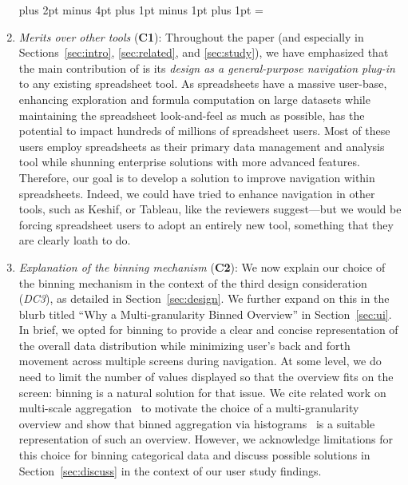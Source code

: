 \begin{enumerate}
\leftmargin=25pt \rightmargin=0pt   \itemindent=0pt \listparindent=0pt \topsep=0pt plus 2pt minus 4pt \partopsep=0pt plus 1pt minus 1pt \parsep=0pt plus 1pt \itemsep=\parsep

\item \textit{Merits over other tools} (\textbf{C1}): 
Throughout the paper (and especially in 
Sections~\ref{sec:intro}, \ref{sec:related},
and \ref{sec:study}), we have emphasized
that the main contribution of \noah
is its \emph{design as a general-purpose navigation plug-in} 
to any existing spreadsheet tool. 
As spreadsheets have a massive user-base, 
enhancing exploration and formula computation 
on large datasets while maintaining 
the spreadsheet look-and-feel as much as possible, 
has the potential to impact hundreds of millions 
of spreadsheet users. 
Most of these users employ spreadsheets 
as their primary data management and analysis 
tool while shunning enterprise solutions 
with more advanced features. 
Therefore, our goal is to develop a 
solution to improve navigation within spreadsheets.
Indeed, we could have tried to enhance navigation
in other tools, such as Keshif, or Tableau, like
the reviewers suggest---but we would be forcing
spreadsheet users to adopt an entirely new tool, something
that they are clearly loath to do. 

\item \textit{Explanation of the binning mechanism} (\textbf{C2}): 
We now explain our choice
of the binning mechanism in 
the context of the third design consideration (\emph{DC3}),
as detailed in Section~\ref{sec:design}.
We further expand on this in the blurb titled 
``Why a Multi-granularity Binned Overview'' 
in Section~\ref{sec:ui}.
In brief, we opted for binning to 
provide a clear and concise 
representation of the overall data 
distribution while minimizing user's back 
and forth movement across multiple screens 
during navigation. 
At some level, we do need to limit the number
of values displayed so that the overview
fits on the screen: binning is a natural solution
for that issue. 
We cite related work on 
multi-scale aggregation~\cite{elmqvist2009hierarchical} 
to motivate the choice of 
a multi-granularity overview
and show that binned aggregation via histograms~\cite{liu2013immens}
is a suitable representation of such an overview.
However, we acknowledge limitations 
for this choice for binning categorical data 
and discuss possible solutions 
in Section~\ref{sec:discuss} 
in the context of our user study findings. 



\end{enumerate}
